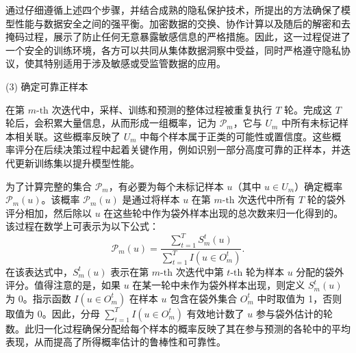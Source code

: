 通过仔细遵循上述四个步骤，并结合成熟的隐私保护技术，所提出的方法确保了模型性能与数据安全之间的强平衡。加密数据的交换、协作计算以及随后的解密和去掩码过程，展示了防止任何无意暴露敏感信息的严格措施。因此，这一过程促进了一个安全的训练环境，各方可以共同从集体数据洞察中受益，同时严格遵守隐私协议，使其特别适用于涉及敏感或受监管数据的应用。 

(3) 确定可靠正样本

在第 $m\text{-th}$ 次迭代中，采样、训练和预测的整体过程被重复执行 $T$ 轮。完成这 $T$ 轮后，会积累大量信息，从而形成一组概率，记为 ${{\mathsf{\mathcal{P}}}_{m}}$，它与 ${{U}_{m}}$ 中所有未标记样本相关联。这些概率反映了 ${{U}_{m}}$ 中每个样本属于正类的可能性或置信度。这些概率评分在后续决策过程中起着关键作用，例如识别一部分高度可靠的正样本，并迭代更新训练集以提升模型性能。

为了计算完整的集合 ${{\mathsf{\mathcal{P}}}_{m}}$，有必要为每个未标记样本 $u$（其中 $u\in {{U}_{m}}$）确定概率 ${{\mathsf{\mathcal{P}}}_{m}}(u)$。该概率 ${{\mathsf{\mathcal{P}}}_{m}}(u)$ 是通过将样本 $u$ 在第 $m\text{-th}$ 次迭代中所有 $T$ 轮的袋外评分相加，然后除以 $u$ 在这些轮中作为袋外样本出现的总次数来归一化得到的。该过程在数学上可表示为以下公式：
\begin{equation}
	{{\mathsf{\mathcal{P}}}_{m}}(u)=\frac{\sum\nolimits_{t=1}^{T}{S_{m}^{t}}(u)}{\sum\nolimits_{t=1}^{T}{I(u\in O_{m}^{t})}}.
\end{equation}
在该表达式中，$S_{m}^{t}(u)$ 表示在第 $m\text{-th}$ 次迭代中第 $t\text{-th}$ 轮为样本 $u$ 分配的袋外评分。值得注意的是，如果 $u$ 在某一轮中未作为袋外样本出现，则定义 $S_{m}^{t}(u)$ 为 0。指示函数 $I(u\in O_{m}^{t})$ 在样本 $u$ 包含在袋外集合 $O_{m}^{t}$ 中时取值为 1，否则取值为 0。因此，分母 $\sum\nolimits_{t=1}^{T}{I(u\in O_{m}^{t})}$ 有效地计数了 $u$ 参与袋外估计的轮数。此归一化过程确保分配给每个样本的概率反映了其在参与预测的各轮中的平均表现，从而提高了所得概率估计的鲁棒性和可靠性。

